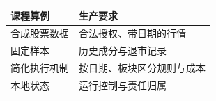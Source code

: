 \begin{tabular}{@{}P{4.0cm}P{8.5cm}@{}}
\toprule
\textbf{课程算例} & \textbf{生产要求} \\
\midrule
合成股票数据 & 合法授权、带日期的行情 \\
固定样本 & 历史成分与退市记录 \\
简化执行机制 & 按日期、板块区分规则与成本 \\
本地状态 & 运行控制与责任归属 \\
\bottomrule
\end{tabular}
